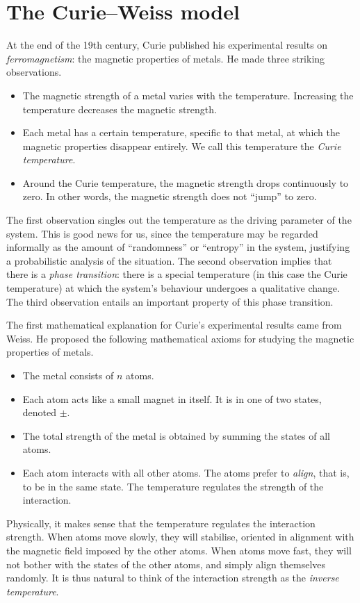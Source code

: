 \section{The Curie--Weiss model}
\label{sec:definitions_examples}

At the end of the 19th century, Curie published his experimental results on 
\emph{ferromagnetism}:
the
magnetic properties of metals.
He made three striking observations.
\begin{itemize}
    \item The magnetic strength of a metal varies with the temperature.
    Increasing the temperature decreases the magnetic strength.
    \item Each metal has a certain temperature, specific to that metal,
    at which the magnetic properties disappear entirely.
    We call this temperature the \emph{Curie temperature}.
    \item Around the Curie temperature, the magnetic strength drops continuously
    to zero. In other words, the magnetic strength does not ``jump'' to zero.
\end{itemize}
The first observation singles out the temperature as the driving parameter of the system.
This is good news for us, since the temperature may be regarded informally as the amount of 
``randomness'' or ``entropy'' in the system, justifying a probabilistic analysis of the situation.
The second observation implies that there is a \emph{phase transition}:
there is a special temperature (in this case the Curie temperature) at which
the system's behaviour undergoes a qualitative change.
The third observation entails an important property of this phase transition.

The first mathematical explanation for Curie's experimental results came from
Weiss.
He proposed the following mathematical axioms for studying the magnetic properties of metals.
\begin{itemize}
    \item The metal consists of $n$ atoms.
    \item Each atom acts like a small magnet in itself.
    It is in one of two states, denoted $\pm$.
    \item The total strength of the metal is obtained by summing the states of all atoms.
    \item Each atom interacts with all other atoms.
    The atoms prefer to \emph{align}, that is, to be in the same state.
    The temperature regulates the strength of the interaction.
\end{itemize}
Physically, it makes sense that the temperature regulates the interaction strength.
When atoms move slowly, they will stabilise, oriented in alignment with the magnetic field imposed by the other atoms.
When atoms move fast, they will not bother with the states of the other atoms, and simply align themselves randomly.
It is thus natural to think of the interaction strength as the \emph{inverse temperature}.

